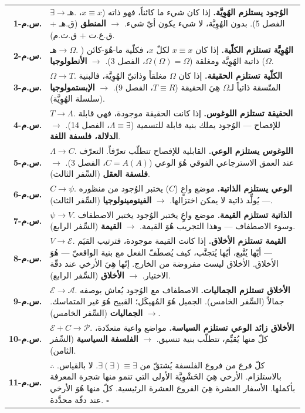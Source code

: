 \documentclass[10pt, openany, oneside]{book}
\renewcommand{\footnotesize}{\fontsize{8.5}{11}\selectfont}
\begin{document}
{\footnotesize
\noindent\begin{tabular}{r p{}}
\textbf{س.م-1.} & $\exists \to \text{هـ}$. \textbf{الوُجود يستلزم الهُوِيَّة.} إذا كان شيء ما كائناً، فهو ذاته ($x \equiv x$، الفصل 5). بدون الهُوِيَّة، لا شيء يكون أيّ شيء. $\to$ \textbf{المنطق} (ق.هـ + ق.ع.ت + ق.ث.م). \\[0.3em]
\textbf{س.م-2.} & $\text{هـ} \to \Omega$. \textbf{الهُوِيَّة تستلزم الكلّية.} إذا كان $x \equiv x$ لكلّ $x$، فكلّية ما-هُوَ-كائن ($\Omega$) ذاتية الهُوِيَّة ومغلقة ($\Omega(\Omega) = \Omega$، الفصل 3). $\to$ \textbf{الأنطولوجيا}. \\[0.3em]
\textbf{س.م-3.} & $\Omega \to T$. \textbf{الكلّية تستلزم الحقيقة.} إذا كان $\Omega$ مغلقاً وذاتيّ الهُوِيَّة، فالبنية المتّسقة ذاتياً لـ$\Omega$ هِيَ الحقيقة ($T \equiv R$، الفصل 9). $\to$ \textbf{الإبستمولوجيا} (سلسلة الهُوِيَّة). \\[0.3em]
\textbf{س.م-4.} & $T \to \Lambda$. \textbf{الحقيقة تستلزم اللوغوس.} إذا كانت الحقيقة موجودة، فهي قابلة للإفصاح --- الوُجود يملك بنية قابلة للتسمية ($\Lambda \equiv \exists$، الفصل 14). $\to$ \textbf{الدلالة، فلسفة اللغة}. \\[0.3em]
\textbf{س.م-5.} & $\Lambda \to C$. \textbf{اللوغوس يستلزم الوعي.} القابلية للإفصاح تتطلّب تعرّفاً. التعرّف عند العمق الاسترجاعي الفوقي هُوَ الوعي ($C = A(A)$، الفصل 3). $\to$ \textbf{فلسفة العقل} (السِّفر الثالث). \\[0.3em]
\textbf{س.م-6.} & $C \to \psi$. \textbf{الوعي يستلزم الذاتية.} موضع واعٍ ($C$) يختبر الوُجود من منظوره --- يُولِّد ذاتية لا يمكن اختزالها. $\to$ \textbf{الفينومينولوجيا} (السِّفر الثالث). \\[0.3em]
\textbf{س.م-7.} & $\psi \to V$. \textbf{الذاتية تستلزم القيمة.} موضع واعٍ يختبر الوُجود يختبر الاصطفاف وسوء الاصطفاف --- وهذا التجريب هُوَ القيمة. $\to$ \textbf{القيمة} (السِّفر الرابع). \\[0.3em]
\textbf{س.م-8.} & $V \to \mathcal{E}$. \textbf{القيمة تستلزم الأخلاق.} إذا كانت القيمة موجودة، فترتيب القيَم --- أيّها يُتَّبع، أيّها يُتجنَّب، كيف يُصطَفّ الفعل مع بنية الواقعيّ --- هُوَ الأخلاق. الأخلاق ليست مفروضة من الخارج. إنّها هِيَ الأرخي عند دقّة الاختيار. $\to$ \textbf{الأخلاق} (السِّفر الرابع). \\[0.3em]
\textbf{س.م-9.} & $\mathcal{E} \to \mathcal{A}$. \textbf{الأخلاق تستلزم الجماليات.} الاصطفاف مع الوُجود يُعاش بوصفه جمالاً (السِّفر الخامس). الجميل هُوَ المُهيكَل؛ القبيح هُوَ غير المتماسك. $\to$ \textbf{الجماليات} (السِّفر الخامس). \\[0.3em]
\textbf{س.م-10.} & $\mathcal{E} + C \to \mathcal{P}$. \textbf{الأخلاق زائد الوعي تستلزم السياسة.} مواضع واعية متعدّدة، كلّ منها يُقيِّم، تتطلّب بنية تنسيق. $\to$ \textbf{الفلسفة السياسية} (السِّفر الثامن). \\[0.3em]
\textbf{س.م-11.} & $\therefore$ كلّ فرع من فروع الفلسفة يُشتقّ من $\exists(\exists) \equiv \exists$. لا بالقياس. بالاستلزام. الأرخي هِيَ الحَشْوِيَّة الأولى التي تنمو منها شجرة المعرفة بأكملها. الأسفار العشرة هِيَ الفروع العشرة الرئيسية. كلّ منها هُوَ الأرخي عند دقّة محدَّدة. $\square$ \\[0.3em]
\end{tabular}
}
\end{document}
